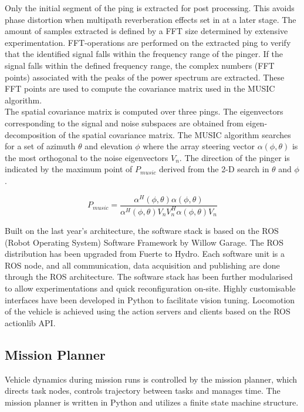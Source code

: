 \documentclass[journal,12pt]{IEEEtran}
\begin{document}
Only the initial segment of the ping is extracted for post processing. This avoids phase distortion when multipath reverberation effects set in at a later stage. The amount of samples extracted is defined by a FFT size  determined by extensive experimentation. FFT-operations are performed on the extracted ping to verify that the identified signal falls within the frequency range of the pinger. If the signal falls within the defined frequency range, the complex numbers (FFT points) associated with the peaks of the power spectrum are extracted. These FFT points are used to compute the covariance matrix used in the MUSIC algorithm. \\

The spatial covariance matrix is computed over three pings. The eigenvectors corresponding to the signal and noise subspaces are obtained from eigen-decomposition of the spatial covariance matrix. The MUSIC algorithm searches for a set of azimuth $\theta$ and elevation $\phi$ where the array steering vector $\alpha(\phi,\theta)$ is the most orthogonal to the noise eigenvectors $V_n$. The direction of the pinger is indicated by the maximum point of $P_{music}$ derived from the 2-D search in $\theta$ and $\phi$.

\begin{equation} 
P_{music} = \frac{\alpha^H(\phi,\theta)\alpha(\phi,\theta)}{\alpha^H(\phi,\theta)V_nV_n^H\alpha(\phi,\theta)V_n} 
\end{equation}

Built on the last year's architecture, the software stack is based on the ROS (Robot Operating System) Software Framework by Willow Garage. The ROS distribution has been upgraded from Fuerte to Hydro. Each software unit is a ROS node, and all communication, data acquisition and publishing are done through the ROS architecture. The software stack has been further modularised to allow experimentations and quick reconfiguration on-site. Highly customisable interfaces have been developed in Python to facilitate vision tuning. Locomotion of the vehicle is achieved using the action servers and clients based on the ROS actionlib API. 

\subsection{Mission Planner} 
Vehicle dynamics during mission runs is controlled by the mission
planner, which directs task nodes, controls trajectory between tasks and manages 
time. The mission planner is written in Python and utilizes a finite state 
machine structure. \\
\end{document}
